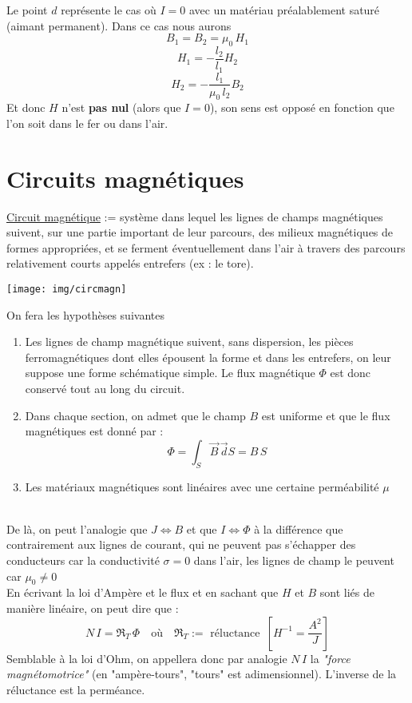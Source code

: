 \documentclass[11pt, a4paper, openany]{book}
\begin{document}
		Le point $d$ représente le cas où $I=0$ avec un matériau préalablement saturé (aimant permanent). Dans ce cas nous aurons $$B_1=B_2=\mu_0\,H_1$$\begin{equation}
		H_1=-\frac{l_2}{l_1}H_2
		\end{equation}
		$$H_2=-\frac{l_1}{\mu_0\,l_2}B_2$$ Et donc $H$ n'est \textbf{pas nul} (alors que $I=0$), son sens est opposé en fonction que l'on soit dans le fer ou dans l'air.
		\section{Circuits magnétiques}
		\underline{Circuit magnétique} := système dans lequel les lignes de champs magnétiques suivent, sur une partie important de leur parcours, des milieux magnétiques de formes appropriées, et se ferment éventuellement dans l'air à travers des parcours relativement courts appelés entrefers (ex : le tore).\\\begin{center}\texttt{[image: img/circmagn]}\end{center}
		On fera les hypothèses suivantes \begin{enumerate}
			\item Les lignes de champ magnétique suivent, sans dispersion, les pièces ferromagnétiques dont elles épousent la forme et dans les entrefers, on leur suppose une forme schématique simple. Le flux magnétique $\Phi$ est donc conservé tout au long du circuit.
			\item Dans chaque section, on admet que le champ $B$ est uniforme et que le flux magnétiques est donné par :\begin{equation}
			\Phi=\int_S\vec B\,\vec dS=B\,S
			\end{equation}
			\item Les matériaux magnétiques sont linéaires avec une certaine perméabilité $\mu$
		\end{enumerate}\ \\
		De là, on peut l'analogie que $J\Leftrightarrow B$ et que $I\Leftrightarrow \Phi$ à la différence que contrairement aux lignes de courant, qui ne peuvent pas s'échapper des conducteurs car la conductivité $\sigma=0$  dans l'air, les lignes de champ le peuvent car $\mu_0\neq 0$\\
		
		En écrivant la loi d'Ampère et le flux et en sachant que $H$ et $B$ sont liés de manière linéaire, on peut dire que : \begin{equation}\label{relcircmagn}
		N\,I=\Re_T\,\Phi\quad\text{où}\quad\Re_T:=\text{ réluctance }\,\left[H^{-1}=\frac{A^2}{J}\right]
		\end{equation}
		Semblable à la loi d'Ohm, on appellera donc par analogie $N\,I$ la \textit{"force magnétomotrice"} (en "ampère-tours", "tours" est adimensionnel). L'inverse de la réluctance est la perméance.\\
		
\end{document}

